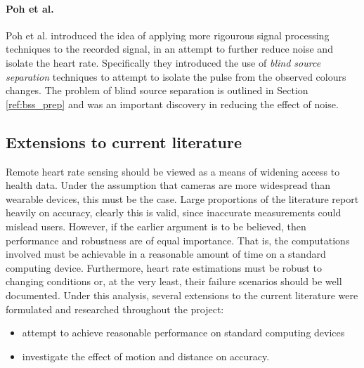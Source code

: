 \paragraph{Poh et al.}
Poh et al. \cite{poh2010non} introduced the idea of applying more rigourous signal processing techniques to the recorded signal, in an attempt to further reduce noise and isolate the heart rate.
Specifically they introduced the use of \textit{blind source separation} techniques to attempt to isolate the pulse from the observed colours changes. The problem of blind source separation is 
outlined in Section \ref{ref:bss_prep} and was an important discovery in reducing the effect of noise.


\subsection{Extensions to current literature}
Remote heart rate sensing should be viewed as a means of widening access to health data. Under the assumption that cameras are more widespread than wearable devices, this must be the case.
Large proportions of the literature report heavily on accuracy, clearly this is valid, since inaccurate measurements could mislead users. However, if the earlier argument is to be believed, then 
performance and robustness are of equal importance. That is, the computations involved must be achievable in a reasonable amount of time on a standard computing device. 
Furthermore, heart rate estimations must be robust to changing conditions or, at the very least, their failure scenarios should be well documented. 
Under this analysis, several extensions to the current literature were formulated and researched throughout the project:
\begin{itemize}
    \item attempt to achieve reasonable performance on standard computing devices
    \item investigate the effect of motion and distance on accuracy.
\end{itemize}


